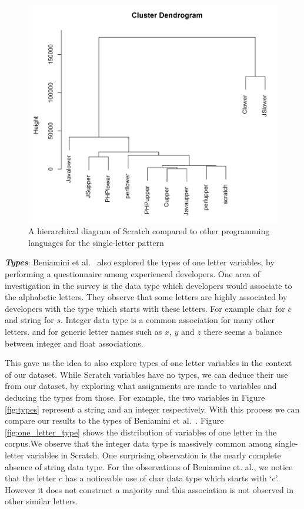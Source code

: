 \documentclass[conference]{IEEEtran}
\begin{document}
\begin{figure}[h]
	\begin{center}
		\includegraphics[width=\columnwidth]{fig/cluster_single_letter}
		\caption{A hierarchical diagram of Scratch compared to other programming languages for the single-letter pattern}
		\label{fig:similarity_single_letter}
	\end{center}
\end{figure} 


\emph{\textbf{Types}}: Beniamini et al.~\cite{Beniamini} also explored the types of one letter variables, by performing a questionnaire among experienced developers. One area of investigation in the survey is the data type which developers would associate to the alphabetic letters. They observe that some letters are highly associated by developers with the type which starts with these letters. For example char for $c$ and string for $s$. Integer data type is a common association for many other letters. and for generic letter names such as $x$, $y$ and $z$ there seems a balance between integer and float associations. 

This gave us the idea to also explore types of one letter variables in the context of our dataset. While Scratch variables have no types, we can deduce their use from our dataset, by exploring what assignments are made to variables and deducing the types from those. For example, the two variables in Figure \ref{fig:types} represent a string and an integer respectively. With this process we can compare our results to the types of Beniamini et al.~\cite{Beniamini}. 
Figure \ref{fig:one_letter_type} shows the distribution of variables of one letter in the corpus.We observe that the integer data type is massively common among single-letter variables in Scratch. One surprising observation is the nearly complete absence of string data type. For the observations of Beniamine et. al., we notice that the letter $c$ has a noticeable use of char data type which starts with `c'. However it does not construct a majority and this association is not observed in other similar letters. 
\end{document}
